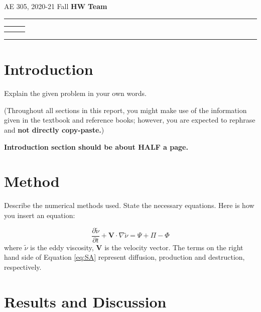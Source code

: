 \documentclass[letterpaper,12pt]{article}
\begin{document}
\begin{center}
AE 305, 2020-21 Fall \hfill \textbf{HW \HWno} \hfill \textbf{Team \TeamNo} \\
\noindent\rule{\textwidth}{0.4pt}
\begin{tabular}{p{} | p{} | p{} }
	\AuthorOneName&\AuthorTwoName&\AuthorThreeName\\
	\textit{\AuthorOneID}&\textit{\AuthorTwoID}&\textit{\AuthorThreeID}
\end{tabular}
\noindent\rule{\textwidth}{0.4pt}
\end{center}

\section{Introduction}

Explain the given problem in your own words.

(Throughout all sections in this report, you might make use of the information 
given in the textbook and reference books; however, you are expected 
to rephrase and \textbf{not directly copy-paste.}) 

\textbf{Introduction section should be about HALF a page.}

\section{Method}

Describe the numerical methods used. State the necessary equations. Here is 
how you insert an equation: 

\begin{equation}
 \frac{\partial \tilde{\nu}}{\partial t} + \mathbf{V} \cdot \nabla \tilde{\nu} 
 = \Psi + \Pi - \Phi
\label{eq:SA} %
\end{equation}
where $\tilde{\nu}$ is the eddy viscosity, $\mathbf{V}$ is the velocity vector.
The terms on the right hand side of Equation \ref{eq:SA} represent diffusion,
 production and destruction, respectively.
  
\newpage %

\section{Results and Discussion}
\end{document}
